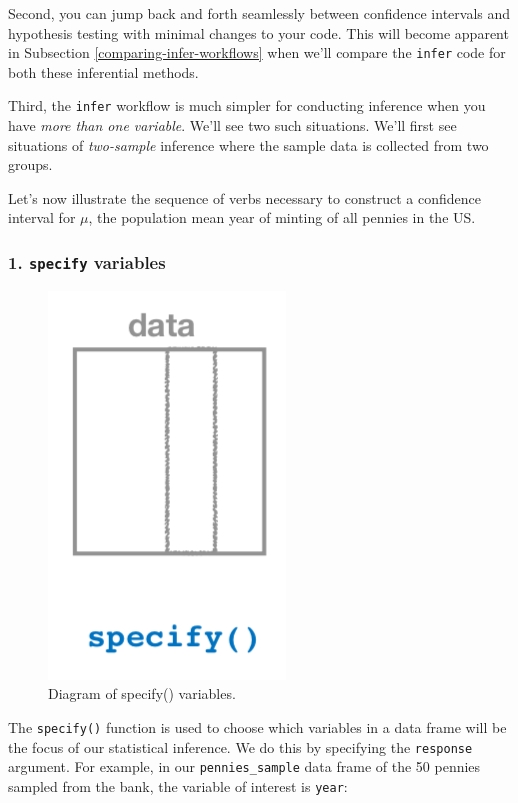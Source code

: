 \documentclass[
]{book}
\newenvironment{Shaded}{\begin{snugshade}}{\end{snugshade}}
\newcommand{\DataTypeTok}[1]{\textcolor[rgb]{0.13,0.29,0.53}{#1}}
\newcommand{\KeywordTok}[1]{\textcolor[rgb]{0.13,0.29,0.53}{\textbf{#1}}}
\newcommand{\NormalTok}[1]{#1}
\newcommand{\OperatorTok}[1]{\textcolor[rgb]{0.81,0.36,0.00}{\textbf{#1}}}
\newcommand{\StringTok}[1]{\textcolor[rgb]{0.31,0.60,0.02}{#1}}
\begin{document}
Second, you can jump back and forth seamlessly between confidence intervals and hypothesis testing with minimal changes to your code. This will become apparent in Subsection \ref{comparing-infer-workflows} when we'll compare the \texttt{infer} code for both these inferential methods.

Third, the \texttt{infer} workflow is much simpler for conducting inference when you have \emph{more than one variable}. We'll see two such situations. We'll first see situations of \emph{two-sample} inference where the sample data is collected from two groups.

Let's now illustrate the sequence of verbs necessary to construct a confidence interval for \(\mu\), the population mean year of minting of all pennies in the US.

\hypertarget{specify-variables}{%
\subsubsection*{\texorpdfstring{1. \texttt{specify} variables}{1. specify variables}}\label{specify-variables}}

\begin{figure}

{\centering \includegraphics[width=0.2\linewidth]{images/flowcharts/infer/specify} 

}

\caption{Diagram of specify() variables.}\label{fig:infer-specify}
\end{figure}

The \texttt{specify()}  function is used to choose which variables in a data frame will be the focus of our statistical inference. We do this by specifying the \texttt{response} argument. For example, in our \texttt{pennies\_sample} data frame of the 50 pennies sampled from the bank, the variable of interest is \texttt{year}:

\begin{Shaded}
\end{Shaded}
\end{document}
